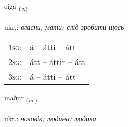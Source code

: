 \documentclass[frontgrid, backgrid]{flacards}\usepackage[]{graphicx}\usepackage[]{xcolor}
\begin{document}
\renewcommand{\blhead}{\vskip5pt {\small\bfseries\footnotesize Sagnorð | дієслово }}
\renewcommand{\bcfoot}{\vskip5pt \hspace{2pt}{\small\bfseries\footnotesize 1K}}


{eiga \small{\textsubscript{(\textit{v.})}} \\[1ex] %
\textphonetic{[eiːɣa]} \\
ukr.: \emph{власни; мати; слід зробити щось} \\  [2ex]
\renewcommand*{\arraystretch}{0.8}
\begin{tabular}{p{1cm}l}
\textsc{1sg}: & á -- átti -- átt \\ 
\textsc{2sg}: & átt -- áttir -- átt \\ 
\textsc{3sg}: & á -- átti -- átt \\ 
\end{tabular}
}

\renewcommand{\flhead}{\vskip5pt \fboxsep=0pt {\small\bfseries\footnotesize Nafnorð | іменник}}
\renewcommand{\fcfoot}{\vskip5pt \fboxsep=0pt \hspace{2pt}{\small\bfseries\footnotesize 1K}}

\renewcommand{\blhead}{\vskip5pt {\small\bfseries\footnotesize Nafnorð | іменник }}
\renewcommand{\bcfoot}{\vskip5pt \hspace{2pt}{\small\bfseries\footnotesize 1K}}


{maður \small{\textsubscript{(\textit{m.})}} \\[1ex] %
\textphonetic{[maːðʏr]} \\
ukr.: \emph{чоловік; людина; людина} \\  [2ex]
\renewcommand*{\arraystretch}{0.8}
}

\end{document}

